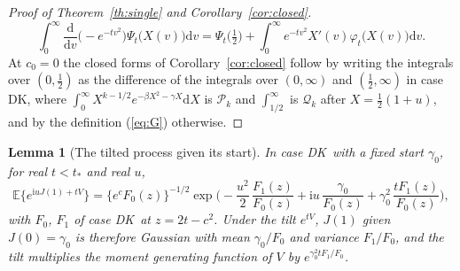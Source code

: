 \documentclass[ecta,nameyear,final]{econsocart}
\newcommand{\E}{{\mathbb E}}
\newcommand{\dr}[1]{{\mathrm d}#1}
\newcommand{\iu}{{\mathrm i}}
\newcommand{\Fk}{\textsf{\upshape DK}}
\newcommand{\cP}{\mathcal{P}}
\newcommand{\cQ}{\mathcal{Q}}
\theoremstyle{plain}
\newtheorem{lemma}{Lemma}
\theoremstyle{definition}
\begin{document}
\begin{appendix}
\begin{proof}[Proof of Theorem~\ref{th:single} and Corollary~\ref{cor:closed}]
\[
\int_0^\infty\frac{\dr{}}{\dr{v}}\big(-e^{-tv^2}\big)\Psi_t\big(X(v)\big)\dr{v}=\Psi_t\big(\tfrac12\big)+\int_0^\infty e^{-tv^2}X'(v)\varphi_t\big(X(v)\big)\dr{v}.
\]  At $c_0=0$ the closed forms of Corollary~\ref{cor:closed} follow by writing the integrals over $(0,\frac12)$ as the difference of the integrals over $(0,\infty)$ and $(\frac12,\infty)$ in case \Fk, where $\int_0^\infty X^{k-1/2}e^{-\beta X^2-\gamma X}\dr{X}$ is $\cP_k$ and $\int_{1/2}^\infty$ is $\cQ_k$ after $X=\frac12(1+u)$, and by the definition (\ref{eq:G}) otherwise.
\end{proof}
\begin{lemma}[The tilted process given its start]
\label{lem:riccati}
In case \Fk\ with a fixed start $\gamma_0$, for real $t<t_*$ and real $u$,
\begin{equation}
\E\big\{e^{\iu uJ(1)+tV}\big\}=\{e^cF_0(z)\}^{-1/2}\exp\Big(-\frac{u^2}{2}\,\frac{F_1(z)}{F_0(z)}
+\iu u\,\frac{\gamma_0}{F_0(z)}+\gamma_0^2\,\frac{tF_1(z)}{F_0(z)}\Big),
\label{eq:riccati}
\end{equation}
with $F_0$, $F_1$ of case \Fk\ at $z=2t-c^2$.  Under the tilt $e^{tV}$, $J(1)$ given $J(0)=\gamma_0$ is therefore Gaussian with mean $\gamma_0/F_0$ and variance $F_1/F_0$, and the tilt multiplies the moment generating function of $V$ by $e^{\gamma_0^2tF_1/F_0}$.
\end{lemma}


\end{appendix}
\end{document}
